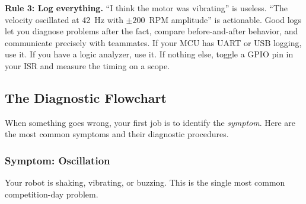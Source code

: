 \textbf{Rule 3: Log everything.} ``I think the motor was vibrating'' is useless. ``The velocity oscillated at 42~Hz with $\pm 200$~RPM amplitude'' is actionable. Good logs let you diagnose problems after the fact, compare before-and-after behavior, and communicate precisely with teammates. If your MCU has UART or USB logging, use it. If you have a logic analyzer, use it. If nothing else, toggle a GPIO pin in your ISR and measure the timing on a scope.

\subsection{The Diagnostic Flowchart}

When something goes wrong, your first job is to identify the \textit{symptom}. Here are the most common symptoms and their diagnostic procedures.

\subsubsection{Symptom: Oscillation}

Your robot is shaking, vibrating, or buzzing. This is the single most common competition-day problem.

